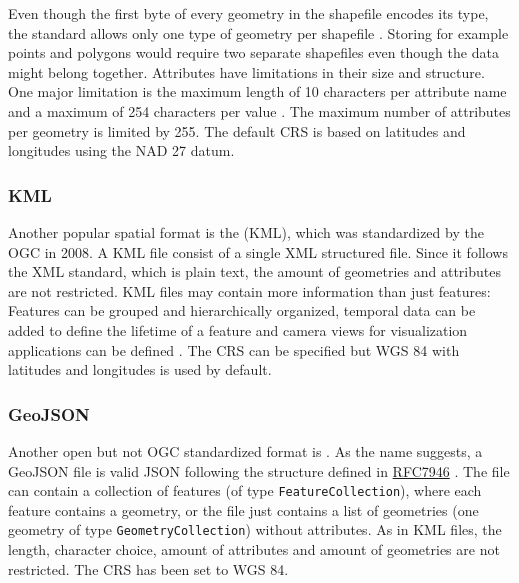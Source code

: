 			Even though the first byte of every geometry in the shapefile encodes its type, the standard allows only one type of geometry per shapefile \cite{esri-shapefile-spec}.
			Storing for example points and polygons would require two separate shapefiles even though the data might belong together.
			Attributes have limitations in their size and structure.
			One major limitation is the maximum length of 10 characters per attribute name and a maximum of 254 characters per value \cite{esri-shapefile-limitations}.
			The maximum number of attributes per geometry is limited by 255.
			The default CRS is based on latitudes and longitudes using the NAD 27 datum\cite{esri-shapefile-coordinate-system}.
			
		\subsubsection{KML}
		
			Another popular spatial format is the  (KML), which was standardized by the OGC in 2008\cite{ogc-kml-2.2}.
			A KML file consist of a single XML structured file.
			Since it follows the XML standard, which is plain text, the amount of geometries and attributes are not restricted.
			KML files may contain more information than just features:
			Features can be grouped and hierarchically organized, temporal data can be added to define the lifetime of a feature and camera views for visualization applications can be defined \cite{ogc-kml-2.3}.
			The CRS can be specified but WGS 84 with latitudes and longitudes is used by default.
		
		\subsubsection{GeoJSON}
		\label{subsubsec:geojson}
		
			Another open but not OGC standardized format is .
			As the name suggests, a GeoJSON file is valid JSON following the structure defined in \href{https://datatracker.ietf.org/doc/html/rfc7946}{RFC7946} \cite{ietf-geojson}.
			The file can contain a collection of features (of type \texttt{FeatureCollection}), where each feature contains a geometry, or the file just contains a list of geometries (one geometry of type \texttt{GeometryCollection}) without attributes.
			As in KML files, the length, character choice, amount of attributes and amount of geometries are not restricted.
			The CRS has been set to WGS 84.
			
